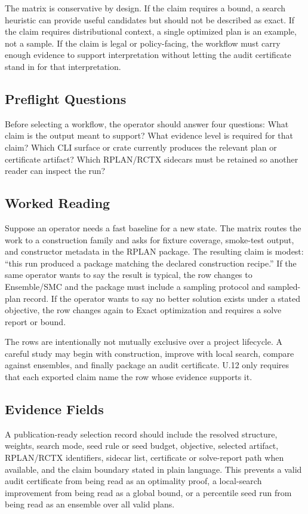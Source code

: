 The matrix is conservative by design. If the claim requires a bound, a search
heuristic can provide useful candidates but should not be described as exact.
If the claim requires distributional context, a single optimized plan is an
example, not a sample. If the claim is legal or policy-facing, the workflow
must carry enough evidence to support interpretation without letting the audit
certificate stand in for that interpretation.

\subsection*{Preflight Questions}

Before selecting a workflow, the operator should answer four questions:
What claim is the output meant to support? What evidence level is required for
that claim? Which CLI surface or crate currently produces the relevant plan or
certificate artifact? Which RPLAN/RCTX sidecars must be retained so another
reader can inspect the run?

\subsection*{Worked Reading}

Suppose an operator needs a fast baseline for a new state. The matrix routes the
work to a construction family and asks for fixture coverage, smoke-test output,
and constructor metadata in the RPLAN package. The resulting claim is modest:
``this run produced a package matching the declared construction recipe.'' If
the same operator wants to say the result is typical, the row changes to
Ensemble/SMC and the package must include a sampling protocol and sampled-plan
record. If the operator wants to say no better solution exists under a stated
objective, the row changes again to Exact optimization and requires a solve
report or bound.

The rows are intentionally not mutually exclusive over a project lifecycle.
A careful study may begin with construction, improve with local search, compare
against ensembles, and finally package an audit certificate. U.12 only requires
that each exported claim name the row whose evidence supports it.

\subsection*{Evidence Fields}

A publication-ready selection record should include the resolved structure,
weights, search mode, seed rule or seed budget, objective, selected artifact,
RPLAN/RCTX identifiers, sidecar list, certificate or solve-report path when
available, and the claim boundary stated in plain language.
This prevents a valid audit certificate from being read as an optimality proof,
a local-search improvement from being read as a global bound, or a percentile
seed run from being read as an ensemble over all valid plans.
